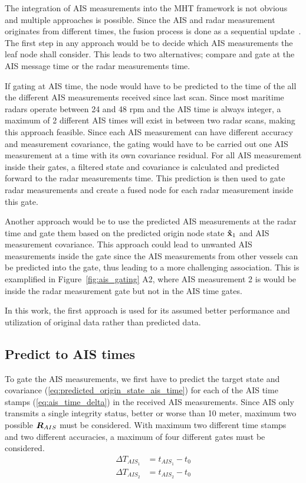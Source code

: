 The integration of AIS measurements into the MHT framework is not obvious and multiple approaches is possible. Since the AIS and radar measurement originates from different times, the fusion process is done as a sequential update~\cite{Bar-Shalom1995}. The first step in any approach would be to decide which AIS measurements the leaf node shall consider. This leads to two alternatives; compare and gate at the AIS message time or the radar measurements time. 

If gating at AIS time, the node would have to be predicted to the time of the all the different AIS measurements received since last scan. Since most maritime radars operate between 24 and 48 \gls{rpm} and the AIS time is always integer, a maximum of 2 different AIS times will exist in between two radar scans, making this approach feasible. Since each AIS measurement can have different accuracy and measurement covariance, the gating would have to be carried out one AIS measurement at a time with its own covariance residual. For all AIS measurement inside their gates, a filtered state and covariance is calculated and predicted forward to the radar measurements time. This prediction is then used to gate radar measurements and create a fused node for each radar measurement inside this gate.

Another approach would be to use the predicted AIS measurements at the radar time and gate them based on the predicted origin node state \(\boldsymbol{\mathbf{\hat{x}}}_1\) and AIS measurement covariance. This approach could lead to unwanted AIS measurements inside the gate since the AIS measurements from other vessels can be predicted into the gate, thus leading to a more challenging association. This is examplified in Figure~\ref{fig:ais_gating} A2, where AIS measurement 2 is would be inside the radar measurement gate but not in the AIS time gates.

In this work, the first approach is used for its assumed better performance and utilization of original data rather than predicted data. 

\subsection{Predict to AIS times}
To gate the AIS measurements, we first have to predict the target state and covariance (\ref{eq:predicted_origin_state_ais_time}) for each of the AIS time stamps (\ref{eq:ais_time_delta}) in the received AIS measurements. Since AIS only transmits a single integrity status, better or worse than 10 meter, maximum two possible \(\bm{R}_{AIS}\) must be considered. With maximum two different time stamps and two different accuracies, a maximum of four different gates must be considered.
\begin{equation}\label{eq:ais_time_delta}
\begin{split}
\Delta T_{AIS_1} &= t_{AIS_1} - t_{0} \\
\Delta T_{AIS_2} &= t_{AIS_2} - t_{0} \\
\end{split}
\end{equation}

